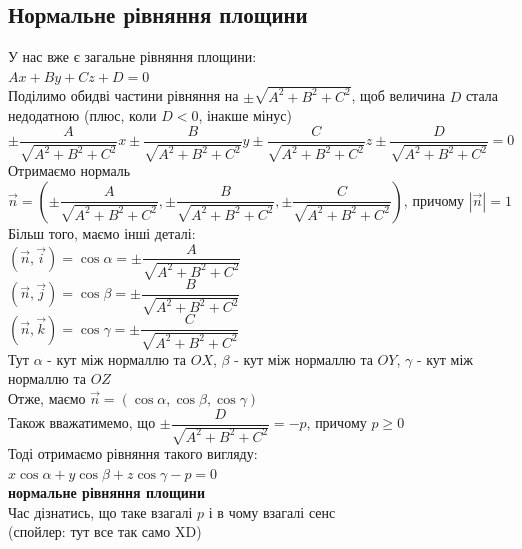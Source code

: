 \documentclass[a4paper, 14pt]{extarticle}
\def\bigline{\vspace{5mm}\\}
\begin{document}
\subsection{Нормальне рівняння площини}
У нас вже є загальне рівняння площини:\\
$Ax + By + Cz + D = 0$\\
Поділимо обидві частини рівняння на $\pm \sqrt{A^2+B^2+C^2}$, щоб величина $D$ стала недодатною (плюс, коли $D<0$, інакше мінус)\\
$\pm \dfrac{A}{\sqrt{A^2+B^2+C^2}}x \pm \dfrac{B}{\sqrt{A^2+B^2+C^2}}y \pm \dfrac{C}{\sqrt{A^2+B^2+C^2}}z \pm \dfrac{D}{\sqrt{A^2+B^2+C^2}} = 0$\\
Отримаємо нормаль $\vec{n} = \left(\pm \dfrac{A}{\sqrt{A^2+B^2+C^2}}, \pm \dfrac{B}{\sqrt{A^2+B^2+C^2}}, \pm \dfrac{C}{\sqrt{A^2+B^2+C^2}} \right)$, причому $|\vec{n}| = 1$\\
Більш того, маємо інші деталі:\\
$(\vec{n}, \vec{i}) = \cos \alpha = \pm \dfrac{A}{\sqrt{A^2+B^2+C^2}}$\\
$(\vec{n}, \vec{j}) = \cos \beta = \pm \dfrac{B}{\sqrt{A^2+B^2+C^2}}$\\
$(\vec{n}, \vec{k}) = \cos \gamma = \pm \dfrac{C}{\sqrt{A^2+B^2+C^2}}$\\
Тут $\alpha$ - кут між нормаллю та $OX$, $\beta$ - кут між нормаллю та $OY$, $\gamma$ - кут між нормаллю та $OZ$\\
Отже, маємо $\vec{n} = (\cos \alpha, \cos \beta, \cos \gamma)$\\
Також вважатимемо, що $\pm \dfrac{D}{\sqrt{A^2+B^2+C^2}} = -p$, причому $p \geq 0$\\
Тоді отримаємо рівняння такого вигляду:\\
$x \cos \alpha + y \cos \beta + z \cos \gamma - p = 0$\\
\textbf{нормальне рівняння площини}
\bigline
Час дізнатись, що таке взагалі $p$ і в чому взагалі сенс \\ (спойлер: тут все так само XD)\\
\\
\end{document}
